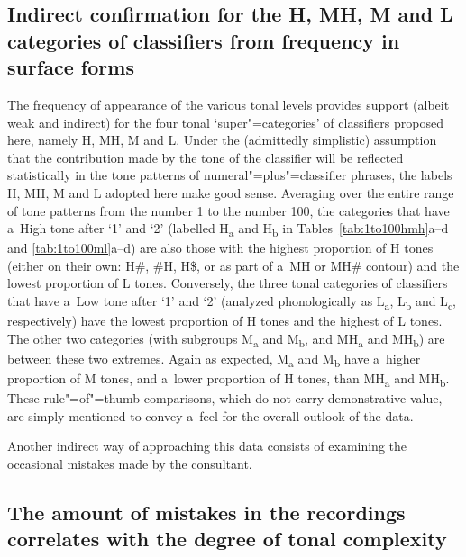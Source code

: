 \subsection[Indirect confirmation for the H, MH, M and L categories]{Indirect confirmation for the H, MH, M and L categories of classifiers from frequency in surface forms}
\label{sec:indirectsupport}

The frequency of appearance of the various tonal levels provides support (albeit weak and indirect) for the four tonal ‘super"=categories’ of classifiers proposed here, namely H, MH, M and L. Under the (admittedly simplistic) assumption that
the contribution made by the tone of the classifier will be reflected statistically in the tone
patterns of numeral"=plus"=classifier phrases, the labels H, MH, M and L adopted here make good sense. Averaging over the entire range of tone patterns from
the number 1 to the number 100, the categories that have a~High tone after ‘1’ and ‘2’ (labelled H\textsubscript{a}
and H\textsubscript{b} in Tables~\ref{tab:1to100hmh}a--d and \ref{tab:1to100ml}a--d) are also those with the highest proportion of H tones (either on their own: H\#,
\#H, H\$, or as part of a~MH or MH\# contour) and the lowest proportion of L tones. Conversely, the three tonal
categories of classifiers that have a~Low tone after ‘1’ and ‘2’ (analyzed phonologically as L\textsubscript{a}, L\textsubscript{b} and L\textsubscript{c}, respectively) have the
lowest proportion of H tones and the highest of L tones. 
The other two categories (with subgroups M\textsubscript{a} and M\textsubscript{b}, and MH\textsubscript{a}
and MH\textsubscript{b}) are between these two extremes. Again as expected, M\textsubscript{a} and M\textsubscript{b} have a~higher proportion of M
tones, and a~lower proportion of H tones, than MH\textsubscript{a} and MH\textsubscript{b}. These rule"=of"=thumb comparisons, which
do not carry {demonstrative} value, are simply mentioned to convey a~feel for the overall outlook of
the data. 

Another indirect way of approaching this data consists of examining the occasional
mistakes made by the consultant.


\subsection[Degree of tonal complexity and amount of mistakes]{The amount of mistakes in the recordings correlates with the degree of tonal complexity}
\label{sec:aboutmistakenrealizationsintherecordings}


